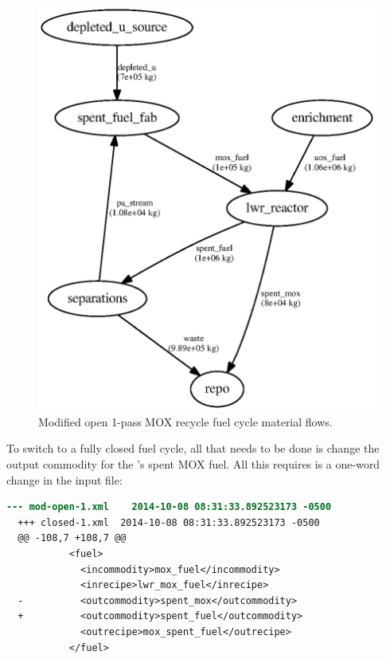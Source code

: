 \begin{figure}[H]
\label{fig:flowmodopen}
\caption{Modified open 1-pass MOX recycle fuel cycle material flows.}
\begin{center}
\includegraphics{./images/flow-mod-open-1.eps}
\end{center}
\end{figure}

To switch to a fully closed fuel cycle, all that needs to be done is change
the output commodity for the 's spent MOX fuel.  All this
requires is a one-word change in the input file: 

\begin{lstlisting}[language=diff]
  --- mod-open-1.xml	2014-10-08 08:31:33.892523173 -0500
  +++ closed-1.xml	2014-10-08 08:31:33.892523173 -0500
  @@ -108,7 +108,7 @@
           <fuel>         
             <incommodity>mox_fuel</incommodity>
             <inrecipe>lwr_mox_fuel</inrecipe>
  -          <outcommodity>spent_mox</outcommodity>
  +          <outcommodity>spent_fuel</outcommodity>
             <outrecipe>mox_spent_fuel</outrecipe>
           </fuel>
\end{lstlisting}

